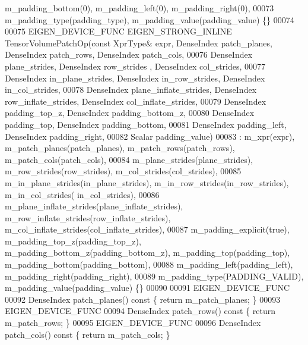 \begin{DoxyCode}
      m\_padding\_bottom(0), m\_padding\_left(0), m\_padding\_right(0),
00073         m\_padding\_type(padding\_type), m\_padding\_value(padding\_value) \{\}
00074 
00075   EIGEN\_DEVICE\_FUNC EIGEN\_STRONG\_INLINE TensorVolumePatchOp(\textcolor{keyword}{const} XprType& expr, DenseIndex patch\_planes, 
      DenseIndex patch\_rows, DenseIndex patch\_cols,
00076                                                            DenseIndex plane\_strides, DenseIndex row\_strides
      , DenseIndex col\_strides,
00077                                                            DenseIndex in\_plane\_strides, DenseIndex 
      in\_row\_strides, DenseIndex in\_col\_strides,
00078                                                            DenseIndex plane\_inflate\_strides, DenseIndex 
      row\_inflate\_strides, DenseIndex col\_inflate\_strides,
00079                                                            DenseIndex padding\_top\_z, DenseIndex 
      padding\_bottom\_z,
00080                                                            DenseIndex padding\_top, DenseIndex 
      padding\_bottom,
00081                                                            DenseIndex padding\_left, DenseIndex 
      padding\_right,
00082                                                            Scalar padding\_value)
00083       : m\_xpr(expr), m\_patch\_planes(patch\_planes), m\_patch\_rows(patch\_rows), m\_patch\_cols(patch\_cols),
00084         m\_plane\_strides(plane\_strides), m\_row\_strides(row\_strides), m\_col\_strides(col\_strides),
00085         m\_in\_plane\_strides(in\_plane\_strides), m\_in\_row\_strides(in\_row\_strides), m\_in\_col\_strides(
      in\_col\_strides),
00086         m\_plane\_inflate\_strides(plane\_inflate\_strides), m\_row\_inflate\_strides(row\_inflate\_strides), 
      m\_col\_inflate\_strides(col\_inflate\_strides),
00087         m\_padding\_explicit(\textcolor{keyword}{true}), m\_padding\_top\_z(padding\_top\_z), m\_padding\_bottom\_z(padding\_bottom\_z), 
      m\_padding\_top(padding\_top), m\_padding\_bottom(padding\_bottom),
00088         m\_padding\_left(padding\_left), m\_padding\_right(padding\_right),
00089         m\_padding\_type(PADDING\_VALID), m\_padding\_value(padding\_value) \{\}
00090 
00091     EIGEN\_DEVICE\_FUNC
00092     DenseIndex patch\_planes()\textcolor{keyword}{ const }\{ \textcolor{keywordflow}{return} m\_patch\_planes; \}
00093     EIGEN\_DEVICE\_FUNC
00094     DenseIndex patch\_rows()\textcolor{keyword}{ const }\{ \textcolor{keywordflow}{return} m\_patch\_rows; \}
00095     EIGEN\_DEVICE\_FUNC
00096     DenseIndex patch\_cols()\textcolor{keyword}{ const }\{ \textcolor{keywordflow}{return} m\_patch\_cols; \}

\end{DoxyCode}
